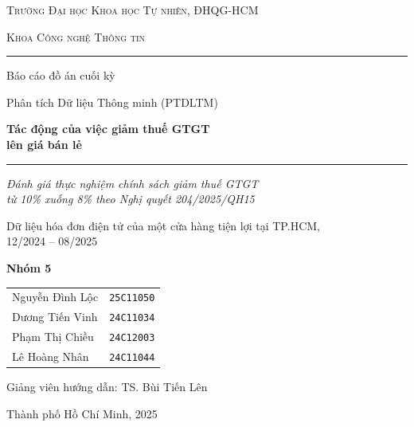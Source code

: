 \documentclass[11pt]{article}
\begin{document}
\begin{titlepage}
  \centering
  {\large\scshape Trường Đại học Khoa học Tự nhiên, ĐHQG-HCM\par}
  {\large\scshape Khoa Công nghệ Thông tin\par}
  \vspace{0.4cm}
  \rule{\linewidth}{0.4pt}

  \vfill

  {\large Báo cáo đồ án cuối kỳ\par}
  \vspace{0.3cm}
  {\large Phân tích Dữ liệu Thông minh (PTDLTM)\par}

  \vspace{1.6cm}

  {\Huge\bfseries Tác động của việc giảm thuế GTGT\\[0.3em] lên giá bán lẻ\par}

  \vspace{1.0cm}
  \rule{0.6\linewidth}{0.4pt}
  \vspace{0.8cm}

  {\large\itshape Đánh giá thực nghiệm chính sách giảm thuế GTGT\\
   từ 10\% xuống 8\% theo Nghị quyết 204/2025/QH15\par}
  \vspace{0.3cm}
  {\normalsize Dữ liệu hóa đơn điện tử của một cửa hàng tiện lợi tại TP.HCM,\\
   12/2024 -- 08/2025\par}

  \vfill

  {\large\bfseries Nhóm 5\par}
  \vspace{0.6cm}
  {\renewcommand{\arraystretch}{1.3}%
  \begin{tabular}{ll}
    Nguyễn Đình Lộc & \texttt{25C11050} \\
    Dương Tiến Vinh & \texttt{24C11034} \\
    Phạm Thị Chiều  & \texttt{24C12003} \\
    Lê Hoàng Nhân   & \texttt{24C11044} \\
  \end{tabular}\par}

  \vspace{0.8cm}
  {\large Giảng viên hướng dẫn: TS. Bùi Tiến Lên\par}

  \vfill

  {\large Thành phố Hồ Chí Minh, 2025\par}
\end{titlepage}
\end{document}
